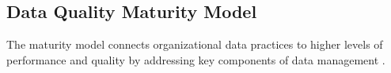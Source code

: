 \documentclass[conference]{IEEEtran}
\begin{document}





\subsection{Data Quality Maturity Model}

The maturity model connects organizational data practices to higher levels of performance and quality by addressing key components of data management \cite{loshin_dqi}. 

\end{document}
